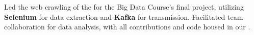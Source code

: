 \item{Led the web crawling of the  for the Big Data Course's final project, utilizing \textbf{Selenium} for data extraction and \textbf{Kafka} for transmission. Facilitated team collaboration for data analysis, with all contributions and code housed in our .}

